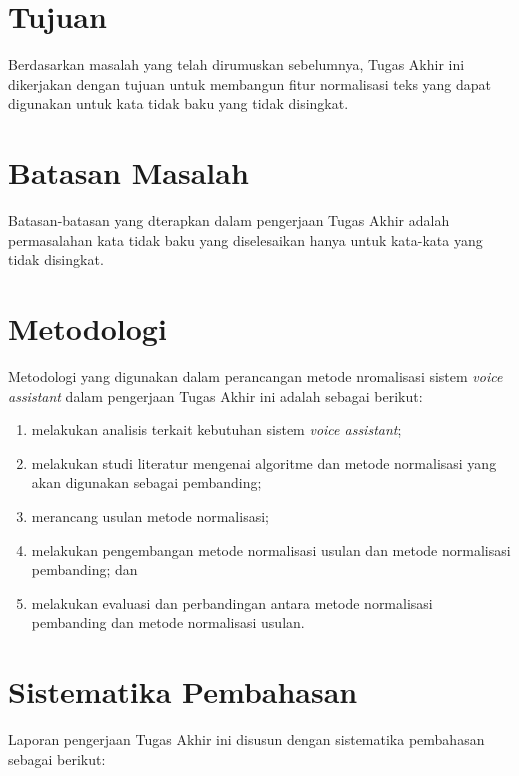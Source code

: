 \section{Tujuan}

Berdasarkan masalah yang telah dirumuskan sebelumnya, Tugas Akhir ini dikerjakan dengan tujuan untuk membangun fitur normalisasi teks yang dapat digunakan untuk kata tidak baku yang tidak disingkat.

\section{Batasan Masalah}

Batasan-batasan yang dterapkan dalam pengerjaan Tugas Akhir adalah permasalahan kata tidak baku yang diselesaikan hanya untuk kata-kata yang tidak disingkat.

\section{Metodologi}

Metodologi yang digunakan dalam perancangan metode nromalisasi sistem \textit{voice assistant} dalam pengerjaan Tugas Akhir ini adalah sebagai berikut:

\begin{enumerate}
	\item melakukan analisis terkait kebutuhan sistem \textit{voice assistant};
	\item melakukan studi literatur mengenai algoritme dan metode normalisasi yang akan digunakan sebagai pembanding;
	\item merancang usulan metode normalisasi;
	\item melakukan pengembangan metode normalisasi usulan dan metode normalisasi pembanding; dan
	\item melakukan evaluasi dan perbandingan antara metode normalisasi pembanding dan metode normalisasi usulan. 
\end{enumerate}

\section{Sistematika Pembahasan}

Laporan pengerjaan Tugas Akhir ini disusun dengan sistematika pembahasan sebagai berikut:

